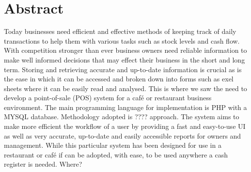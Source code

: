 \chapter{Abstract}
Today businesses need efficient and effective methods of keeping track of daily transactions to help them with various tasks such as stock levels and cash flow. With competition stronger than ever business owners need reliable information to make well informed decisions that may effect their business in the short and long term. Storing and retrieving accurate and up-to-date information is crucial as is the ease in which it can be accessed and broken down into forms such as exel sheets where it can be easily read and analysed. This is where we saw the need to develop a point-of-sale (POS) system for a café or restaurant business environment. The main programming language for implementation is PHP with a MYSQL database. 
Methodology adopted is ???? approach. 
The system aims to make more efficient the workflow of a user by providing a fast and easy-to-use UI as well as very accurate, up-to-date and easily accessible reports for owners and management.
While this particular system has been designed for use in a restaurant or café if can be adopted, with ease, to be used anywhere a cash register is needed. Where?